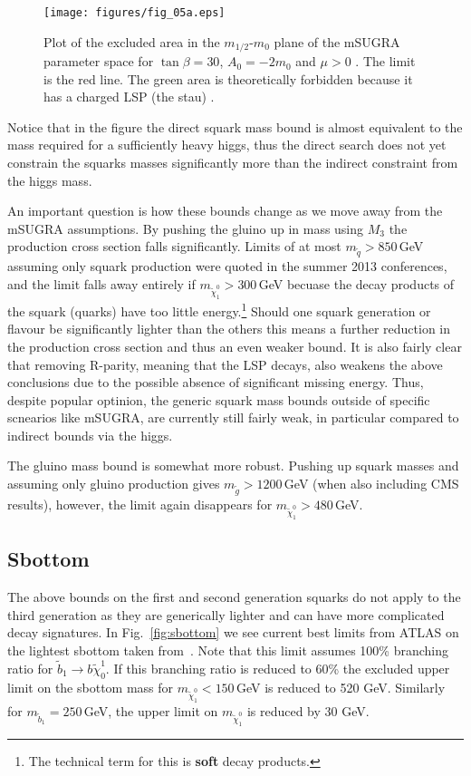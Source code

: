 \documentclass[notes.tex]{subfiles}
\begin{document}
\begin{figure}[h!]
\begin{center}
\texttt{[image: figures/fig\_05a.eps]} 
\caption{Plot of the excluded area in the $m_{1/2}$-$m_0$ plane of the mSUGRA parameter space for $\tan\beta=30$, $A_0=-2m_0$ and $\mu >0$ . The limit is the red line. The green area is theoretically forbidden because it has a charged LSP (the stau) \cite{ATLAS-CONF-2013-047}.\label{squarkgluinolimit}}
\end{center}
\end{figure}

Notice that in the figure the direct squark mass bound is almost equivalent to the mass required for a sufficiently heavy higgs, thus the direct search does not yet constrain the squarks masses significantly  more than the indirect constraint from the higgs mass. 

An important question is how these bounds change as we move away from the mSUGRA assumptions. By pushing the gluino up in mass using $M_3$ the production cross section falls significantly. Limits of at most  $m_{\tilde{q}}>850$\,GeV assuming only squark production were quoted in the summer 2013 conferences, and the limit falls away entirely if $m_{\tilde{\chi}_1^0}>300$\,GeV becuase the decay products of the squark (quarks) have too little energy.\footnote{The technical term for this is {\bf soft} decay products.} Should one squark generation or flavour be significantly lighter than the others this means a further reduction in the production cross section and thus an even weaker bound. It is also fairly clear that removing R-parity, meaning that the LSP decays, also weakens the above conclusions due to the possible absence of significant missing energy. Thus, despite popular optinion, the generic squark mass bounds outside of specific scnearios like mSUGRA, are currently still fairly weak, in particular compared to indirect bounds via the higgs.

The gluino mass bound is somewhat more robust. Pushing up squark masses and assuming only gluino production gives $m_{\tilde{g}}>1200$\,GeV (when also including CMS results), however, the limit again disappears for $m_{\tilde{\chi}_1^0}>480$\,GeV.

\subsection{Sbottom}
The above bounds on the first and second generation squarks do not apply to the third generation as they are generically lighter and can have more complicated decay signatures. In Fig.~\ref{fig:sbottom} we see current best limits from ATLAS on the lightest sbottom taken from~\cite{Aad:2013ija}. Note that this limit assumes 100\% branching ratio for $\tilde b_1\to b \tilde \chi_0^1$. If this branching ratio  is reduced to 60\% the excluded upper limit on the sbottom mass for $m_{\tilde\chi_1^0} < 150$\,GeV is reduced to 520 GeV. Similarly for $m_{\tilde b_1} = 250$\,GeV, the upper limit on $m_{\tilde\chi_1^0}$ is reduced by 30 GeV.
\end{document}
